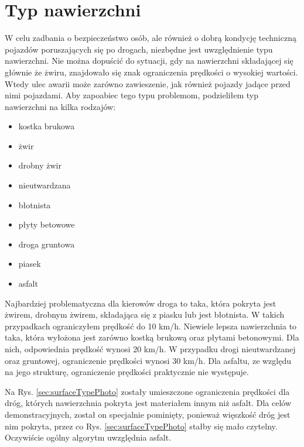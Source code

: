 \newpage
\section{Typ nawierzchni}
\label{sec:surfaceType}

W celu zadbania o bezpieczeństwo osób, ale również o dobrą kondycję techniczną pojazdów poruszających się po drogach, niezbędne jest uwzględnienie typu nawierzchni. Nie można dopuścić do sytuacji, gdy na nawierzchni składającej się głównie że żwiru, znajdowało się znak ograniczenia prędkości o wysokiej wartości. Wtedy ulec awarii może zarówno zawieszenie, jak również pojazdy jadące przed nimi pojazdami. Aby zapoabiec tego typu problemom, podzieliłem typ nawierzchni na kilka rodzajów:

\begin{itemize}
\item kostka brukowa
\item żwir
\item drobny żwir
\item nieutwardzana
\item błotnista
\item płyty  betowowe
\item droga gruntowa
\item piasek
\item asfalt
\end{itemize}

Najbardziej problematyczna dla kierowów droga to taka, która pokryta jest żwirem, drobnym żwirem, składająca się z piasku lub jest błotnista. W takich przypadkach ograniczyłem prędkość do 10 km/h. Niewiele lepsza nawierzchnia to taka, która wyłożona jest zarówno kostką brukową oraz płytami betonowymi. Dla nich, odpowiednia prędkość wynosi 20 km/h. W przypadku drogi nieutwardzanej oraz gruntowej, ograniczenie prędkości wynosi 30 km/h. Dla asfaltu, ze względu na jego strukturę, ograniczenie prędkości praktycznie nie występuje. 

Na Rys. \ref{sec:surfaceTypePhoto} zostały umieszczone ograniczenia prędkości dla dróg, których nawierzchnia pokryta jest materiałem innym niż asfalt. Dla celów demonstracyjnych, został on specjalnie pominięty, ponieważ więszkość dróg jest nim pokryta, przez co Rys. \ref{sec:surfaceTypePhoto} stałby się mało czytelny. Oczywiście ogólny algorytm uwzględnia asfalt.

